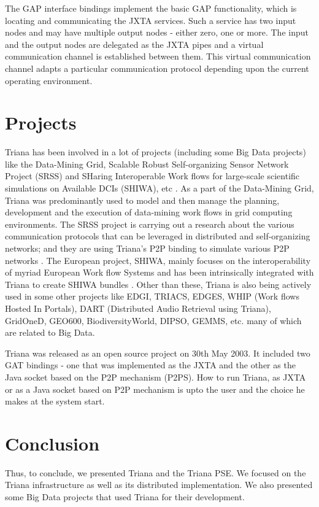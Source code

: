 \documentclass[9pt,twocolumn,twoside]{styles/osajnl}
\begin{document}
The GAP interface bindings implement the basic GAP functionality, which 
is locating and communicating the JXTA services. Such a service has two 
input nodes and may have multiple output nodes - either zero, one or 
more. The input and the output nodes are delegated as the JXTA pipes and 
a virtual communication channel is established between them. This 
virtual communication channel adapts a particular communication protocol 
depending upon the current operating environment. 

\section{Projects}

Triana has been involved in a lot of projects (including some Big Data projects) 
like the Data-Mining Grid, 
Scalable Robust Self-organizing Sensor Network Project (SRSS) and 
SHaring Interoperable Work flows for large-scale
scientific simulations on Available DCIs (SHIWA), etc \cite{Triana-projects} 
\cite{Triana-Data-Mining-Grid} \cite{Triana-SRSS} \cite{Triana-SHIWA} .  As a part of
the Data-Mining Grid, Triana was predominantly used to model and then
manage the planning, development and the execution of data-mining work
flows in grid computing environments.  The SRSS
project is carrying out a research about the various communication
protocols that can be leveraged in distributed and self-organizing
networks; and they are using Triana's P2P binding to simulate various
P2P networks \cite{Triana-SRSS}.  The European project, SHIWA, mainly focuses on the
interoperability of myriad European Work flow Systems and has been
intrinsically integrated with Triana to create SHIWA bundles \cite{Triana-SHIWA}.  
Other than these, Triana is also being actively used
in some other projects like EDGI, TRIACS, EDGES, WHIP (Work flows
Hosted In Portals), DART (Distributed Audio Retrieval using Triana),
GridOneD, GEO600, BiodiversityWorld, DIPSO, GEMMS, etc. many of which
are related to Big Data.

Triana was released as an open source project on 30th May 2003. It 
included two GAT bindings - one that was implemented as the JXTA and the 
other as the Java socket based on the P2P mechanism (P2PS). How to run 
Triana, as JXTA or as a Java socket based on P2P mechanism is upto the 
user and the choice he makes at the system start.

\section{Conclusion}

Thus, to conclude, we presented Triana and the Triana PSE.  We focused
on the Triana infrastructure as well as its distributed
implementation.  We also presented some Big Data projects that used
Triana for their development.



\end{document}
